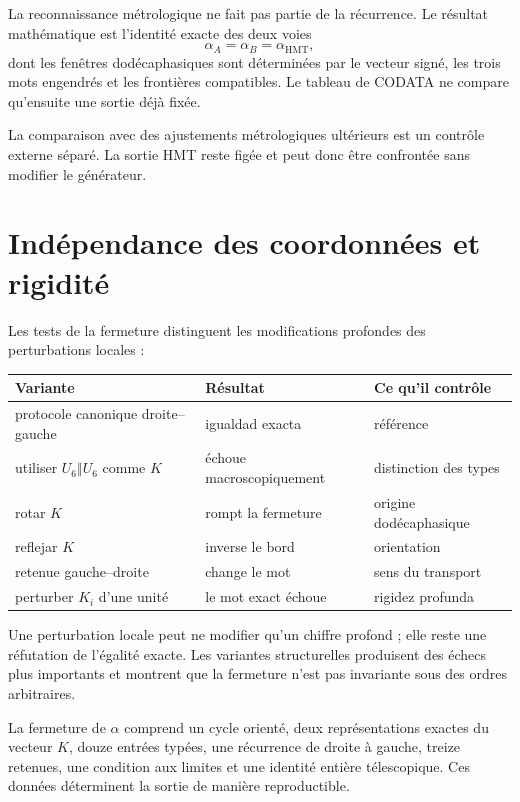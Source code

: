 La reconnaissance métrologique ne fait pas partie de la récurrence. Le résultat
mathématique est l'identité exacte des deux voies
\[
 \alpha_A=\alpha_B=\alpha_{\mathrm{HMT}},
\]
dont les fenêtres dodécaphasiques sont déterminées par le vecteur signé, les
trois mots engendrés et les frontières compatibles. Le tableau de CODATA
ne compare qu'ensuite une sortie déjà fixée.

La comparaison avec des ajustements métrologiques ultérieurs est un contrôle externe
séparé. La sortie HMT reste figée et peut donc être confrontée sans
modifier le générateur.

\section{Indépendance des coordonnées et rigidité}

Les tests de la fermeture distinguent les modifications profondes des perturbations
locales :
\begin{center}
\small
\begin{tabularx}{\textwidth}{@{}lYY@{}}
\toprule
Variante & Résultat & Ce qu'il contrôle \\
\midrule
protocole canonique droite--gauche & igualdad exacta & référence \\
utiliser \(U_6\Vert U_6\) comme \(K\) & échoue macroscopiquement & distinction des types \\
rotar \(K\) & rompt la fermeture & origine dodécaphasique \\
reflejar \(K\) & inverse le bord & orientation \\
retenue gauche--droite & change le mot & sens du transport \\
perturber \(K_i\) d'une unité & le mot exact échoue & rigidez profunda \\
\bottomrule
\end{tabularx}
\end{center}
Une perturbation locale peut ne modifier qu'un chiffre profond ; elle reste une
réfutation de l'égalité exacte. Les variantes structurelles produisent des échecs
plus importants et montrent que la fermeture n'est pas invariante sous des ordres arbitraires.

\begin{remark}
La fermeture de \(\alpha\) comprend un cycle orienté, deux représentations
exactes du vecteur \(K\), douze entrées typées, une récurrence de droite à
gauche, treize retenues, une condition aux limites et une identité entière
télescopique. Ces données déterminent la sortie de manière reproductible.
\end{remark}

